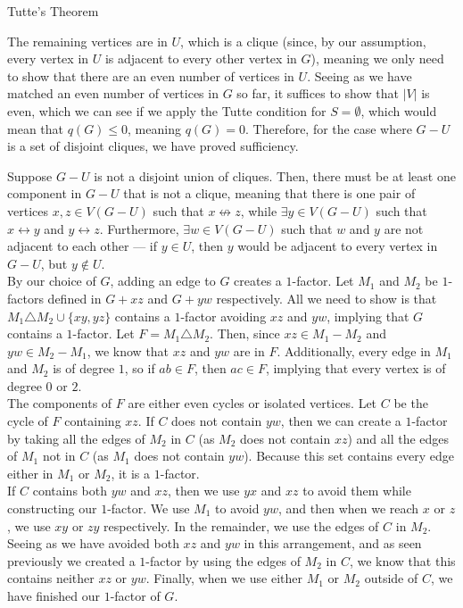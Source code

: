 \documentclass[10pt]{extarticle}
\begin{document}
\begin{problem}{Tutte's Theorem}
\begin{description}[font=\normalfont\scshape]
\begin{description}[font=\normalfont\scshape]
            The remaining vertices are in $U$, which is a clique (since, by our assumption, every vertex in $U$ is adjacent to every other vertex in $G$), meaning we only need to show that there are an even number of vertices in $U$. Seeing as we have matched an even number of vertices in $G$ so far, it suffices to show that $|V|$ is even, which we can see if we apply the Tutte condition for $S = \emptyset$, which would mean that $q(G) \leq 0$, meaning $q(G) = 0$. Therefore, for the case where $G-U$ is a set of disjoint cliques, we have proved sufficiency.
          \item[Case 2] Suppose $G-U$ is not a disjoint union of cliques. Then, there must be at least one component in $G-U$ that is not a clique, meaning that there is one pair of vertices $x,z\in V(G-U)$ such that  $x\not\leftrightarrow z$, while $\exists y\in V(G-U)$ such that $x\leftrightarrow y$ and $y\leftrightarrow z$. Furthermore, $\exists w\in V(G-U)$ such that $w$ and $y$ are not adjacent to each other --- if $y\in U$, then $y$ would be adjacent to every vertex in $G-U$, but $y\notin U$.\\

            By our choice of $G$, adding an edge to $G$ creates a $1$-factor. Let $M_1$ and $M_2$ be $1$-factors defined in $G+xz$ and $G+yw$ respectively. All we need to show is that $M_1\triangle M_2 \cup \{xy,yz\}$ contains a $1$-factor avoiding $xz$ and $yw$, implying that $G$ contains a $1$-factor. Let $F = M_1 \triangle M_2$. Then, since $xz\in M_1-M_2$ and $yw\in M_2 - M_1$, we know that $xz$ and $yw$ are in $F$. Additionally, every edge in $M_1$ and $M_2$ is of degree $1$, so if $ab\in F$, then $ac\in F$, implying that every vertex is of degree $0$ or $2$.\\

            The components of $F$ are either even cycles or isolated vertices. Let $C$ be the cycle of $F$ containing $xz$. If $C$ does not contain $yw$, then we can create a $1$-factor by taking all the edges of $M_2$ in $C$ (as $M_2$ does not contain $xz$) and all the edges of $M_1$ not in $C$ (as $M_1$ does not contain $yw$). Because this set contains every edge either in $M_1$ or $M_2$, it is a $1$-factor.\\

            If $C$ contains both $yw$ and $xz$, then we use $yx$ and $xz$ to avoid them while constructing our $1$-factor. We use $M_1$ to avoid $yw$, and then when we reach $x$ or $z$, we use $xy$ or $zy$ respectively. In the remainder, we use the edges of $C$ in $M_2$. Seeing as we have avoided both $xz$ and $yw$ in this arrangement, and as seen previously we created a $1$-factor by using the edges of $M_2$ in $C$, we know that this contains neither $xz$ or $yw$. Finally, when we use either $M_1$ or $M_2$ outside of $C$, we have finished our $1$-factor of $G$.
        \end{description}
    \end{description}
  \end{problem}
\end{document}
